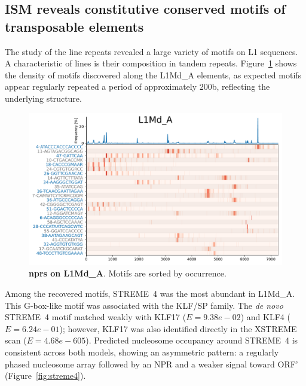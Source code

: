 \documentclass[11pt]{book}
\begin{document}
\subsection{ISM reveals constitutive conserved motifs of transposable elements}
The study of the \gls{line} repeats revealed a large variety of motifs on L1 sequences. A characteristic of \glspl{line} is their composition in tandem repeats. Figure~\ref{fig:l1_md_a} shows the density of motifs discovered along the L1Md\_A elements, as expected motifs appear regularly repeated a period of approximately 200b, reflecting the underlying structure.

\begin{figure}[htbp]
    \centering
    \includegraphics[width=\textwidth]{Figures/Results/xstreme_onrep_seq/L1Md_A_multimot.pdf}
    \caption{\textbf{\glspl{npr} on L1Md\_A}. Motifs are sorted by occurrence.}
   \label{fig:l1_md_a}
\end{figure}


Among the recovered motifs, STREME~4 was the most abundant in L1Md\_A. This G-box-like motif was associated with the KLF/SP family. The \textit{de novo} STREME~4 motif matched weakly with KLF17 ($E=9.38e-02$) and KLF4 ($E=6.24e-01$); however, KLF17 was also identified directly in the XSTREME scan ($E=4.68e-605$). Predicted nucleosome occupancy around STREME~4 is consistent across both models, showing an asymmetric pattern: a regularly phased nucleosome array followed by an NPR and a weaker signal toward ORF' (Figure~\ref{fig:streme4}).
\end{document}
